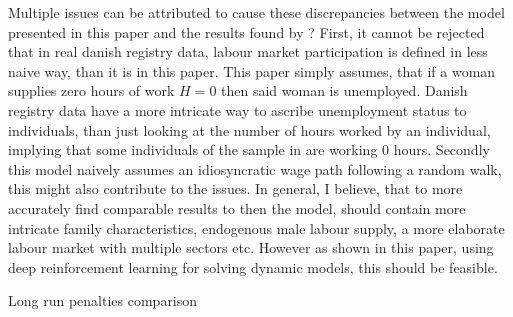 Multiple issues can be attributed to cause these discrepancies between the model presented in this paper and the results found by \textcite{kleven_children_2019}? First, it cannot be rejected that in real danish registry data, labour market participation is defined in less naive way, than it is in this paper. This paper simply assumes, that if a woman supplies zero hours of work $H=0$ then said woman is unemployed. Danish registry data have a more intricate way to ascribe unemployment status to individuals, than just looking at the number of hours worked by an individual, implying that some individuals of the sample in \textcite{kleven_children_2019} are working 0 hours. Secondly this model naively assumes an idiosyncratic wage path following a random walk, this might also contribute to the issues. In general, I believe, that to more accurately find comparable results to \textcite{kleven_children_2019} then the model, should contain more intricate family characteristics, endogenous male labour supply, a more elaborate labour market with multiple sectors etc. However as shown in this paper, using deep reinforcement learning for solving dynamic models, this should be feasible.

\begin{table}[ht]
    \centering
    
    \caption{Long run penalties comparison}
    \label{tab:extended_results}
\end{table}




